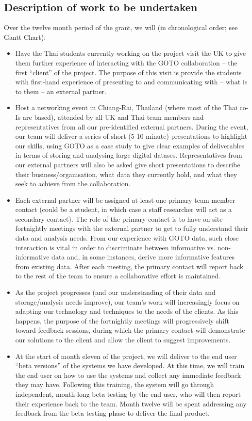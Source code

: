 \documentclass[11pt]{article}
\begin{document}
\subsection{Description of work to be undertaken}
Over the twelve month period of the grant, we will (in chronological order; see Gantt Chart):
\begin{itemize}[leftmargin=6mm]
\item Have the Thai students currently working on the project visit the UK to give them further experience of interacting with the GOTO collaboration -- the first ``client'' of the project. The purpose of this visit is provide the students with first-hand experience of presenting to and communicating with -- what is to them -- an external partner.
\item Host a networking event in Chiang-Rai, Thailand (where most of the Thai co-Is are based), attended by all UK and Thai team members and representatives from all our pre-identified external partners. During the event, our team will deliver a series of short (5-10 minute) presentations to highlight our skills, using GOTO as a case study to give clear examples of deliverables in terms of storing and analysing large digital datases. Representatives from our external partners will also be asked give short presentations to describe their business/organisation, what data they currently hold, and what they seek to achieve from the collaboration.  
\item Each external partner will be assigned at least one primary team member contact (could be a student, in which case a staff researcher will act as a secondary contact). The role of the primary contact is to have on-site fortnightly meetings with the external partner to get to fully understand their data and analysis needs. From our experience with GOTO data, such close interaction is vital in order to discriminate between informative vs. non-informative data and, in some instances, derive more informative features from existing data. After each meeting, the primary contact will report back to the rest of the team to ensure a collaborative effort is maintained.
\item As the project progresses (and our understanding of their data and storage/analysis needs improve), our team's work will increasingly focus on adapting our technology and techniques to the needs of the clients. As this happens, the purpose of the fortnightly meetings will progressively shift toward feedback sessions, during which the primary contact will demonstrate our solutions to the client and allow the client to suggest improvements. 
\item At the start of month eleven of the project, we will deliver to the end user ``beta versions'' of the systems we have developed. At this time, we will train the end user on how to use the systems and collect any immediate feedback they may have. Following this training, the system will go through independent, month-long beta testing by the end user, who will then report their experience back to the team. Month twelve will be spent addressing any feedback from the beta testing phase to deliver the final product.
\end{itemize}
\end{document}
